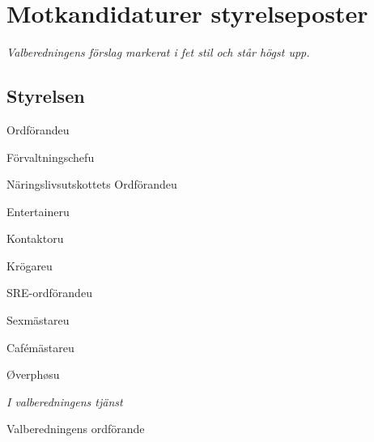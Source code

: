 \documentclass[10pt]{article}
\def\doctype{Sena Handlingar} %
\def\mname{Valmötet} %
\def\mnum{VM/18} %
\def\date{2018-11-29} %
\def\mtime{17:15}
\def\place{E:A}
\begin{document}
    
    
   
   
   \section{Motkandidaturer styrelseposter}
   \emph{Valberedningens förslag markerat i fet stil och står högst upp.}
   
   \subsection{Styrelsen}
   
   \begin{vallista}
    \begin{post}{Ordförande}{u}
    \end{post}
    \begin{post}{Förvaltningschef}{u}
    \end{post}
    \begin{post}{Näringslivsutskottets Ordförande}{u}
    \end{post}
    \begin{post}{Entertainer}{u}
    \end{post}
    \begin{post}{Kontaktor}{u}
        \end{post}
        \begin{post}{Krögare}{u}
        \end{post}
        \begin{post}{SRE-ordförande}{u}
        \end{post}
        \begin{post}{Sexmästare}{u}
        \end{post}
        \begin{post}{Cafémästare}{u}
        \end{post}
        \begin{post}{Øverphøs}{u}
        \end{post}
    \end{vallista}
    

    \begin{signatures}{1}
        \emph{I valberedningens tjänst}
        \signature{Pontus Landgren}{Valberedningens ordförande}
    \end{signatures}
    
    
\end{document}
